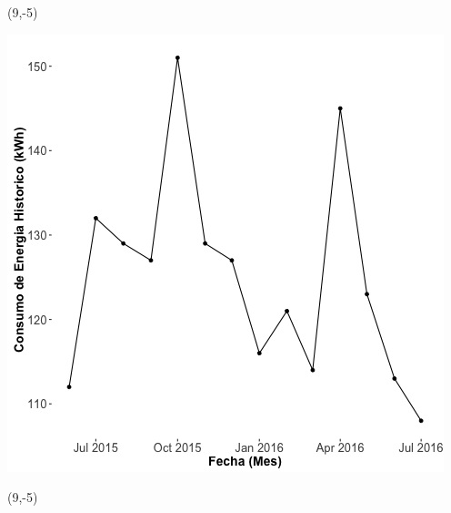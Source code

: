 \documentclass{article}\usepackage[]{graphicx}\usepackage[]{color}
\newenvironment{knitrout}{}{} %
\begin{document}
 \begin{textblock}{1}(9,-5)
\begin{minipage}{20em}
\begingroup

\endgroup
\end{minipage}
\end{textblock}

\begin{knitrout}
\color{fgcolor}
\includegraphics[scale=0.65]{figure/A22_historico_energia} 
\end{knitrout}

 \begin{textblock}{1}(9,-5)
\begin{minipage}{20em}
\begingroup

\endgroup
\end{minipage}
\end{textblock}
\end{document}
